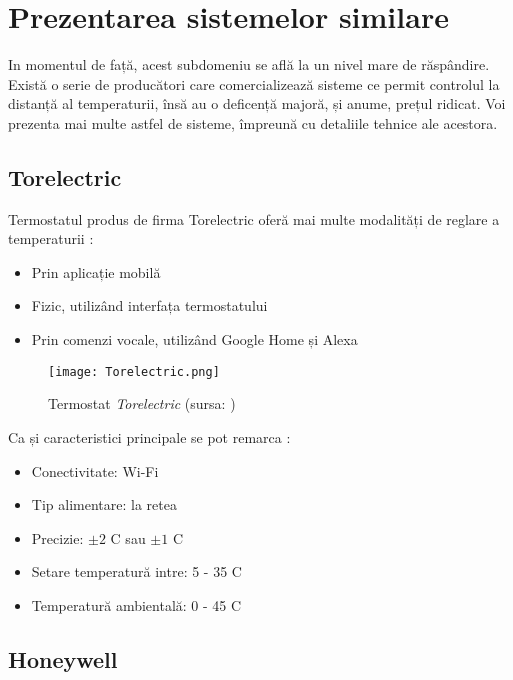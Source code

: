 \chapter{Prezentarea sistemelor similare}\label{ch:2sistemeSimilare}

	In momentul de față, acest subdomeniu se află la un nivel mare de răspândire. Există o serie de producători care comercializează sisteme ce permit controlul la distanță al temperaturii, însă au o deficență majoră, și anume, prețul ridicat. Voi prezenta mai multe astfel de sisteme, împreună cu detaliile tehnice ale acestora. 	

\section{Torelectric}
	Termostatul produs de firma Torelectric oferă mai multe modalități de reglare a temperaturii \cite{torelectric}:
	\begin{itemize}
  	\setlength{\itemindent}{2em}
		\itemsep0em
		\item Prin aplicație mobilă
		\item Fizic, utilizând interfața termostatului
		\item Prin comenzi vocale, utilizând Google Home și Alexa
	\end{itemize}
	

	\begin{figure}[H]
    		\centering
    		\texttt{[image: Torelectric.png]}
		\caption{Termostat \textit{Torelectric} (sursa: \cite{torelectric})}
	\end{figure}

	Ca și caracteristici principale se pot remarca \cite{torelectric}:
	\begin{itemize}
	\setlength{\itemindent}{2em}
		\itemsep0em
		\item Conectivitate: Wi-Fi
		\item Tip alimentare: la retea
		\item Precizie: $\pm 2$ \textdegree{}C sau $\pm 1$ \textdegree{}C
		\item Setare temperatură intre: 5 - 35 \textdegree{}C
		\item Temperatură ambientală: 0 - 45 \textdegree{}C
	\end{itemize}

\section{Honeywell}

